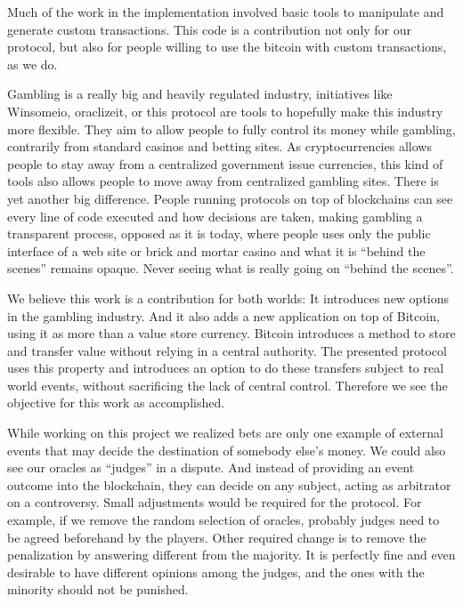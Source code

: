 Much of the work in the implementation involved basic tools to manipulate and
  generate custom transactions.
This code is a contribution not only for our protocol, but also for people
  willing to use the bitcoin with custom transactions, as we do.

Gambling is a really big and heavily regulated industry, initiatives like
  Winsomeio, oraclizeit, or this protocol are tools to hopefully  make this
  industry more flexible.
They aim to allow people to fully control its money while gambling, contrarily
  from standard casinos and betting sites.
As cryptocurrencies allows people to stay away from a centralized government
  issue currencies, this kind of tools also allows people to move away from
  centralized gambling sites.
There is yet another big difference.
People running protocols on top of blockchains can see every line of code
  executed and how decisions are taken, making gambling a transparent process,
  opposed as it is today, where people uses only the public interface of a web
  site or brick and mortar casino and what it is ``behind the scenes'' remains
  opaque.
Never seeing what is really going on ``behind the scenes''.

We believe this work is a contribution for both worlds: It introduces new
  options in the gambling industry. And it also adds a new application on top of
  Bitcoin, using it as more than a value store currency.
Bitcoin introduces a method to store and transfer value without relying in a
  central authority.
The presented protocol uses this property and introduces an option to do
  these transfers subject to real world events, without sacrificing the lack
  of central control.
Therefore we see the objective for this work as accomplished.

While working on this project we realized bets are only one example of external
  events that may decide the destination of somebody else's money.
We could also see our oracles as ``judges'' in a dispute.
And instead of providing an event outcome into the blockchain, they can
  decide on any subject, acting as arbitrator on a controversy.
Small adjustments would be required for the protocol.
For example, if we remove the random selection of oracles, probably judges need
  to be agreed beforehand by the players.
Other required change is to remove the penalization by answering different
  from the majority.
It is perfectly fine and even desirable to have different opinions among the
  judges, and the ones with the minority should not be punished.

